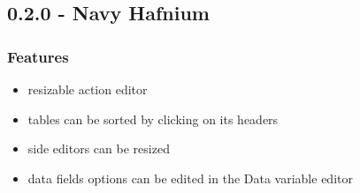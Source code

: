 \subsection*{0.2.0 - Navy Hafnium}
  \subsubsection*{Features}
    \begin{itemize}
      \item resizable action editor
      \item tables can be sorted by clicking on its headers
      \item side editors can be resized
      \item data fields options can be edited in the Data variable editor
    \end{itemize}

